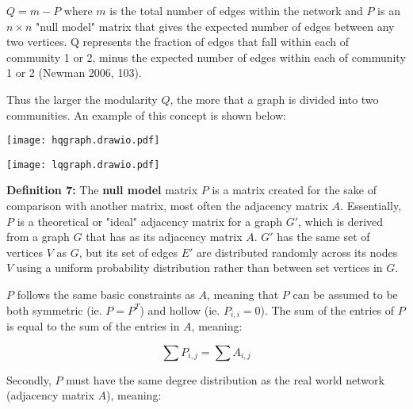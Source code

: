 \documentclass{article}
\begin{document}
\bigskip

\indent $Q = m - P$ where $m$ is the total number of edges within the network and $P$ is an $n \times n$ "null model" matrix that gives the expected number of edges between any two vertices. 
  Q represents the fraction of edges that fall within each of community 1 or 2, minus the expected number of edges within each of community 1 or 2 (Newman 2006, 103).

\bigskip 

\noindent Thus the larger the modularity $Q$, the more that a graph is divided into two communities. 
An example of this concept is shown below:

\bigskip

\noindent\begin{minipage}{.5\textwidth}
\centering
\texttt{[image: hqgraph.drawio.pdf]}
\label{fig:fig23}            
\end{minipage}%
\begin{minipage}{.5\textwidth}
\centering

\texttt{[image: lqgraph.drawio.pdf]}


\label{fig:fig24}            
\end{minipage}

\bigskip

\textbf{Definition 7:} The \textbf{null model} matrix $P$ is a matrix created for the sake of comparison with another matrix, most often the adjacency matrix $A$. 
Essentially, $P$ is a theoretical or "ideal" adjacency matrix for a graph $G'$, which is derived from a graph $G$ that has as its adjacency matrix $A$. 
$G'$ has the same set of vertices $V$ as $G$, but its set of edges $E'$ are distributed randomly across its nodes $V$ using a uniform probability distribution rather than between set vertices in $G$.   

\bigskip 

$P$ follows the same basic constraints as $A$, meaning that $P$ can be assumed to be both symmetric (ie. $P = P^T$) and hollow (ie. $P_{i,i} = 0$). 
The sum of the entries of $P$ is equal to the sum of the entries in $A$, meaning:

$$\sum P_{i,j} = \sum A_{i,j}$$

\bigskip

Secondly, $P$ must have the same degree distribution as the real world network (adjacency matrix $A$), meaning:
\end{document}
